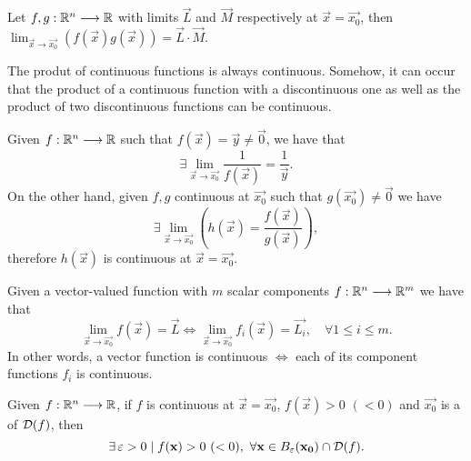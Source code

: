 \begin{prop}
    Let $\appl{f, g}{\Rtn}{\R}$ with limits $\vec{L}$ and $\vec{M}$ respectively at $\vec{x} = \vec{x_0}$, then
        $\lim_{\vec{x}\to\vec{x_0}}\left(f(\vec{x})g(\vec{x})\right) = \vec{L}\cdot\vec{M}$.
\end{prop}

\begin{remark}
    The produt of continuous functions is always continuous. Somehow, it can occur that the product of a continuous 
    function with a discontinuous one as well as the product of two discontinuous functions can be continuous.
\end{remark}

\begin{prop}
    Given $\appl{f}{\Rtn}{\R}$ such that $f(\vec{x}) = \vec{y}\neq\vec{0}$, we have that
    \begin{equation}
        \exists\lim_{\vec{x}\to\vec{x_0}}\frac{1}{f(\vec{x})} = \frac{1}{\vec{y}}.
    \end{equation}
    On the other hand, given $f, g$ continuous at $\vec{x_0}$ such that $g(\vec{x_0})\neq\vec{0}$ we have
    \begin{equation}
        \exists\lim_{\vec{x}\to\vec{x_0}}\left(h(\vec{x}) = \frac{f(\vec{x})}{g(\vec{x})}\right),
    \end{equation}
    therefore $h(\vec{x})$ is continuous at $\vec{x} = \vec{x_0}$.
\end{prop}

\begin{prop}
    Given a vector-valued function with $m$ scalar components $\appl{f}{\Rtn}{\R^m}$ we have that
    \begin{equation}
        \lim_{\vec{x}\to\vec{x_0}}f(\vec{x}) = \vec{L}\iff\lim_{\vec{x}\to\vec{x_0}} f_i(\vec{x}) = \vec{L_i},\quad\forall
            1 \leq i \leq m.
    \end{equation}
    In other words, a vector function is continuous $\iff$ each of its component functions $f_i$ is continuous.
\end{prop}

\begin{prop}
    Given $\appl{f}{\Rtn}{\R}$, if $f$ is continuous at $\vec{x} = \vec{x_0}$, $f(\vec{x}) > 0$ $(< 0)$ and $\vec{x_0}$ is
    a  of $\dom{f}$, then
    \begin{equation}
        \exists\epsilon > 0\st f(\vec{x}) > 0\ (< 0),\ \forall\vec{x}\in\oball{\epsilon}{\vec{x_0}}\cap\dom{f}.
    \end{equation}
\end{prop}

